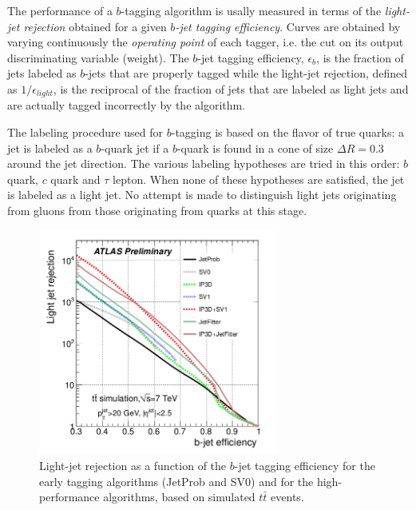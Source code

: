  The performance of a $b$-tagging algorithm is usally  measured in terms of the \emph{light-jet rejection} obtained for a given \emph{$b$-jet tagging efficiency}.  Curves are obtained by varying continuously the \emph{operating point} of each tagger, i.e. the cut on its output discriminating variable (weight).  The $b$-jet tagging efficiency,  $\epsilon_b$,  is the fraction of jets labeled as $b$-jets that are properly tagged while the light-jet rejection, defined as $1/\epsilon_{light}$, is the reciprocal of the fraction of jets that are labeled as light jets and are actually tagged incorrectly by the algorithm. 

The labeling procedure used for $b$-tagging is based on the flavor of true quarks: a jet is labeled as a $b$-quark jet if a $b$-quark is found in a cone of size $\Delta R = 0.3$ around the jet direction.  The various labeling hypotheses are tried in this order: $b$ quark, $c$ quark and $\tau$ lepton. When none of these hypotheses are satisfied, the jet
is labeled as a light jet. No attempt is made to distinguish light jets originating from gluons from those originating from quarks at this stage.

\begin{figure}[htbp]
  \begin{center}
      \includegraphics[width=0.7\textwidth]{btaggingperformance.png}
    \caption{Light-jet rejection as a function of the $b$-jet tagging efficiency for the early tagging algorithms (JetProb and SV0) and for the high-performance algorithms, based on simulated $t\bar{t}$ events. }
    \label{fig:btaggingperformance}
  \end{center}
\end{figure}

